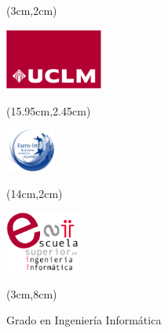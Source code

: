 %
% 


\cleardoublepage
\setcounter{page}{1} \null

\begin{textblock*}{3cm}(3cm,2cm) 
\begin{flushleft}
\includegraphics[height=2cm]{figs/logouclm.png}
\end{flushleft}
\end{textblock*}


\begin{textblock*}{2.5cm}(15.95cm,2.45cm) 
\begin{flushright}
\includegraphics[height=1.4cm]{figs/euroinf.jpg}
\end{flushright}
\end{textblock*}

\begin{textblock*}{2cm}(14cm,2cm)  %
\begin{flushright}
\includegraphics[height=2cm]{figs/logoesii.png}
\end{flushright}
\end{textblock*}



\begin{textblock*}{\textwidth}(3cm,8cm) 
\begin{center}\doublespacing 
{\fontsize{18pt}{4pt}\selectfont {}}

\medskip
{\fontsize{18pt}{4pt}\selectfont Grado en Ingeniería Informática}

\medskip
{\fontsize{16pt}{4pt}\selectfont \espec}
\end{center}
\end{textblock*}



